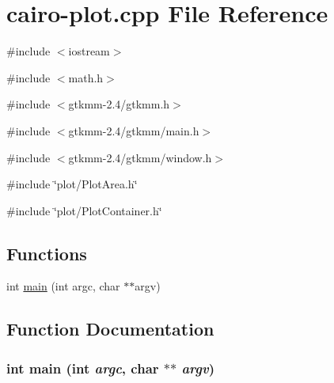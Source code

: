\hypertarget{cairo-plot_8cpp}{
\section{cairo-\/plot.cpp File Reference}
\label{cairo-plot_8cpp}
}
{\ttfamily \#include $<$iostream$>$}\par
{\ttfamily \#include $<$math.h$>$}\par
{\ttfamily \#include $<$gtkmm-\/2.4/gtkmm.h$>$}\par
{\ttfamily \#include $<$gtkmm-\/2.4/gtkmm/main.h$>$}\par
{\ttfamily \#include $<$gtkmm-\/2.4/gtkmm/window.h$>$}\par
{\ttfamily \#include \char`\"{}plot/PlotArea.h\char`\"{}}\par
{\ttfamily \#include \char`\"{}plot/PlotContainer.h\char`\"{}}\par
\subsection*{Functions}
\begin{DoxyCompactItemize}
\item 
int \hyperlink{cairo-plot_8cpp_a3c04138a5bfe5d72780bb7e82a18e627}{main} (int argc, char $\ast$$\ast$argv)
\end{DoxyCompactItemize}


\subsection{Function Documentation}
\hypertarget{cairo-plot_8cpp_a3c04138a5bfe5d72780bb7e82a18e627}{
\subsubsection[{main}]{\setlength{\rightskip}{0pt plus 5cm}int main (int {\em argc}, \/  char $\ast$$\ast$ {\em argv})}}
\label{cairo-plot_8cpp_a3c04138a5bfe5d72780bb7e82a18e627}
